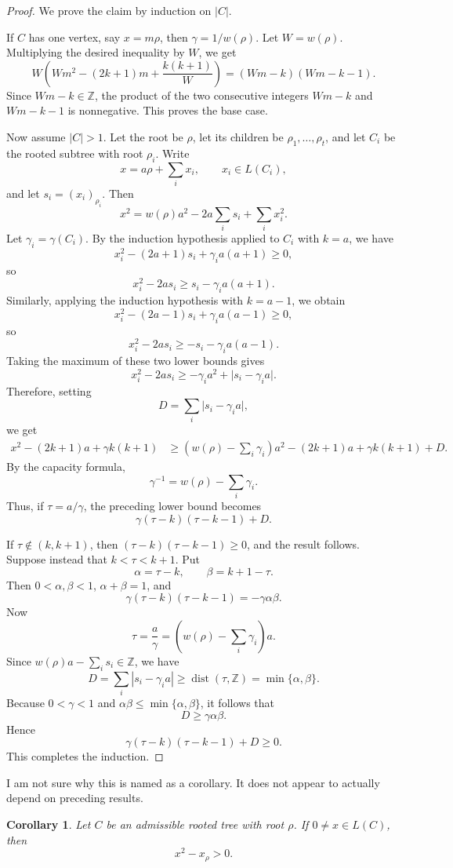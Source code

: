 \documentclass[12pt]{article}
\newtheorem{corollary}{Corollary}
\newcommand{\review}[1]{\begin{reviewbox}#1\end{reviewbox}}
\begin{document}
\begin{proof}
We prove the claim by induction on \(|C|\).

If \(C\) has one vertex, say \(x=m\rho\), then \(\gamma=1/w(\rho)\). Let \(W=w(\rho)\). Multiplying the desired inequality by \(W\), we get
\[
W\left(Wm^2-(2k+1)m+\frac{k(k+1)}{W}\right)
=
(Wm-k)(Wm-k-1).
\]
Since \(Wm-k\in\mathbb Z\), the product of the two consecutive integers \(Wm-k\) and \(Wm-k-1\) is nonnegative. This proves the base case.

Now assume \(|C|>1\). Let the root be \(\rho\), let its children be \(\rho_1,\dots,\rho_t\), and let \(C_i\) be the rooted subtree with root \(\rho_i\). Write
\[
x=a\rho+\sum_i x_i,
\qquad x_i\in L(C_i),
\]
and let \(s_i=(x_i)_{\rho_i}\). Then
\[
x^2=w(\rho)a^2-2a\sum_i s_i+\sum_i x_i^2.
\]
Let \(\gamma_i=\gamma(C_i)\). By the induction hypothesis applied to \(C_i\) with \(k=a\), we have
\[
x_i^2-(2a+1)s_i+\gamma_i a(a+1)\ge 0,
\]
so
\[
x_i^2-2as_i\ge s_i-\gamma_i a(a+1).
\]
Similarly, applying the induction hypothesis with \(k=a-1\), we obtain
\[
x_i^2-(2a-1)s_i+\gamma_i a(a-1)\ge 0,
\]
so
\[
x_i^2-2as_i\ge -s_i-\gamma_i a(a-1).
\]
Taking the maximum of these two lower bounds gives
\[
x_i^2-2as_i
\ge
-\gamma_i a^2+\bigl|s_i-\gamma_i a\bigr|.
\]
Therefore, setting
\[
D=\sum_i \bigl|s_i-\gamma_i a\bigr|,
\]
we get
\begin{align*}
x^2-(2k+1)a+\gamma k(k+1)
&\ge
\left(w(\rho)-\sum_i\gamma_i\right)a^2-(2k+1)a+\gamma k(k+1)+D.
\end{align*}
By the capacity formula,
\[
\gamma^{-1}=w(\rho)-\sum_i\gamma_i.
\]
Thus, if \(\tau=a/\gamma\), the preceding lower bound becomes
\[
\gamma(\tau-k)(\tau-k-1)+D.
\]

If \(\tau\notin(k,k+1)\), then \((\tau-k)(\tau-k-1)\ge 0\), and the result follows. Suppose instead that \(k<\tau<k+1\). Put
\[
\alpha=\tau-k,
\qquad
\beta=k+1-\tau.
\]
Then \(0<\alpha,\beta<1\), \(\alpha+\beta=1\), and
\[
\gamma(\tau-k)(\tau-k-1)=-\gamma\alpha\beta.
\]
Now
\[
\tau
=
\frac{a}{\gamma}
=
\left(w(\rho)-\sum_i\gamma_i\right)a.
\]
Since \(w(\rho)a-\sum_i s_i\in\mathbb Z\), we have
\[
D
=
\sum_i |s_i-\gamma_i a|
\ge
\operatorname{dist}(\tau,\mathbb Z)
=
\min\{\alpha,\beta\}.
\]
Because \(0<\gamma<1\) and \(\alpha\beta\le \min\{\alpha,\beta\}\), it follows that
\[
D\ge \gamma\alpha\beta.
\]
Hence
\[
\gamma(\tau-k)(\tau-k-1)+D\ge 0.
\]
This completes the induction.
\end{proof}
\review{I am not sure why this is named as a corollary. It does not appear to actually depend on preceding results.}
\begin{corollary}
Let \(C\) be an admissible rooted tree with root \(\rho\). If \(0\ne x\in L(C)\), then
\[
x^2-x_\rho>0.
\]
\end{corollary}
\end{document}
